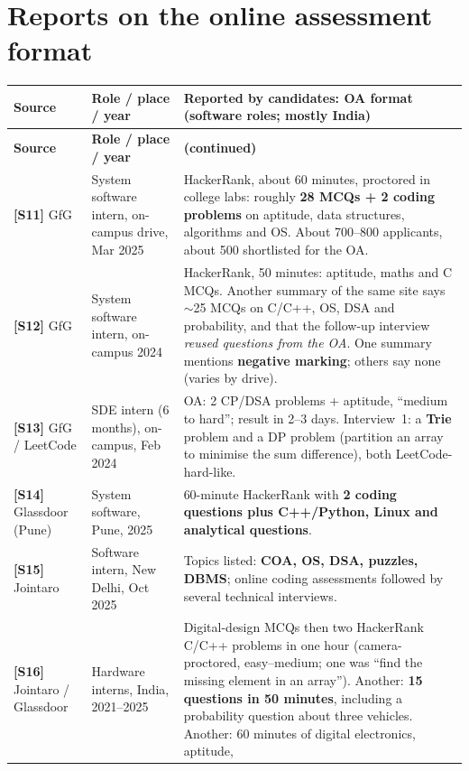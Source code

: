 \documentclass[10pt,a4paper,openany,oneside]{report}
\newcommand{\prio}[1]{\texorpdfstring{\ifcase#1\or{\color{gold}\ding{72}}\or{\color{gold}\ding{72}\ding{72}}\or{\color{gold}\ding{72}\ding{72}\ding{72}}\fi}{}}
\begin{document}
\section{Reports on the online assessment format \prio{3}}
{\small\setlength{\tabcolsep}{3pt}
\begin{longtable}{@{}>{\raggedright\arraybackslash}p{2.1cm}>{\raggedright\arraybackslash}p{3.1cm}p{10.6cm}@{}}
\toprule
\rowcolor{orange!22}\textbf{Source} & \textbf{Role / place / year} & \textbf{Reported by candidates: OA format (software roles; mostly India)}\\
\midrule
\endfirsthead
\toprule
\rowcolor{orange!22}\textbf{Source} & \textbf{Role / place / year} & \textbf{(continued)}\\
\midrule
\endhead
\textbf{[S11]} GfG & System software intern, on-campus drive, Mar 2025 &
 HackerRank, about 60 minutes, proctored in college labs: roughly \textbf{28 MCQs + 2 coding problems} on aptitude, data structures, algorithms
 and OS. About 700--800 applicants, about 500 shortlisted for the OA.\\
\textbf{[S12]} GfG & System software intern, on-campus 2024 &
 HackerRank, 50 minutes: aptitude, maths and C MCQs. Another summary of the same site says $\sim$25 MCQs on C/C++, OS, DSA and probability, and that
 the follow-up interview \emph{reused questions from the OA}. One summary mentions \textbf{negative marking}; others say none (varies by drive).\\
\textbf{[S13]} GfG / LeetCode & SDE intern (6 months), on-campus, Feb 2024 &
 OA: 2 CP/DSA problems + aptitude, ``medium to hard''; result in 2--3 days. Interview~1: a \textbf{Trie} problem and a DP problem
 (partition an array to minimise the sum difference), both LeetCode-hard-like.\\
\textbf{[S14]} Glassdoor (Pune) & System software, Pune, 2025 &
 60-minute HackerRank with \textbf{2 coding questions plus C++/Python, Linux and analytical questions}.\\
\textbf{[S15]} Jointaro & Software intern, New Delhi, Oct 2025 &
 Topics listed: \textbf{COA, OS, DSA, puzzles, DBMS}; online coding assessments followed by several technical interviews.\\
\textbf{[S16]} Jointaro / Glassdoor & Hardware interns, India, 2021--2025 &
 Digital-design MCQs then two HackerRank C/C++ problems in one hour (camera-proctored, easy--medium; one was ``find the missing element in an array'').
 Another: \textbf{15 questions in 50 minutes}, including a probability question about three vehicles. Another: 60 minutes of digital electronics, aptitude,

\end{longtable}}
\end{document}
